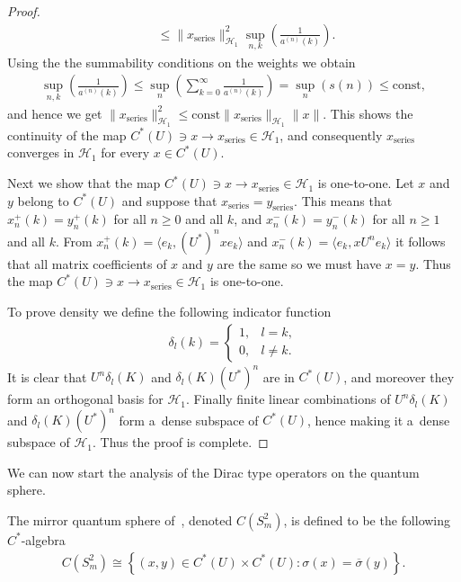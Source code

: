 \begin{proof}
\begin{gather*}
\qquad
\le \|x_{\textrm{series}}\|^2_{\mathcal{H}_1}\sup_{n,k}\left(\frac{1}{a^{(n)}(k)}\right).
\end{gather*}
Using the the summability conditions on the weights we obtain
\begin{gather*}
\sup_{n,k}\left(\frac{1}{a^{(n)}(k)}\right) \le \sup_{n}\left(\sum\limits_{k=0}^\infty \frac{1}{a^{(n)}(k)}\right)=
\sup_{n} (s(n)) \le \textrm{const},
\end{gather*}
and hence we get $\|x_{\textrm{series}}\|_{\mathcal{H}_1}^2 \le
\textrm{const}\|x_{\textrm{series}}\|_{\mathcal{H}_1}\|x\|$.
This shows the continuity of the map $C^*(U)\ni x\to x_\textrm{series}\in \mathcal{H}_1$, and consequently
$x_\textrm{series}$ converges in $\mathcal{H}_1$ for every $x\in C^*(U)$.

Next we show that the map $C^*(U)\ni x\to x_\textrm{series}\in \mathcal{H}_1$ is one-to-one.
Let $x$ and $y$ belong to $C^*(U)$ and suppose that $x_\textrm{series} = y_\textrm{series}$.
This means that $x_n^+(k) = y_n^+(k)$ for all $n\ge0$ and all $k$, and $x_n^-(k) = y_n^-(k)$ for all $n\ge1$ and all
$k$.
From $x_n^+(k) = \langle e_k, (U^*)^nx e_k\rangle$ and $x_n^-(k) = \langle e_k, xU^n e_k\rangle$ it follows that all
matrix coef\/f\/icients of $x$ and $y$ are the same so we must have $x=y$.
Thus the map $C^*(U)\ni x\to x_\textrm{series}\in \mathcal{H}_1$ is one-to-one.

To prove density we def\/ine the following indicator function
\begin{gather*}
\delta_l(k) =
\begin{cases}
1, & l=k,
\\
0, & l\neq k.
\end{cases}
\end{gather*}
It is clear that $U^n\delta_l(K)$ and $\delta_l(K)(U^*)^n$ are in $C^*(U)$, and moreover they form an orthogonal basis
for $\mathcal{H}_1$.
Finally f\/inite linear combinations of $U^n\delta_l(K)$ and $\delta_l(K)(U^*)^n$ form a~dense subspace of $C^*(U)$, hence
making it a~dense subspace of $\mathcal{H}_1$.
Thus the proof is complete.
\end{proof}

We can now start the analysis of the Dirac type operators on the quantum sphere.

\begin{defin}
The mirror quantum sphere of~\cite{HMS}, denoted $C(S_{m}^2)$, is def\/ined to be the following $C^*$-algebra
\begin{gather*}
C(S_{m}^2) \cong \left\{(x,y)\in C^*(U)\times C^*(U): \sigma(x) = \overline{\sigma}(y)\right\}.
\end{gather*}
\end{defin}

